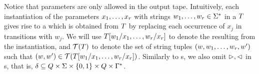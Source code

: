 Notice that parameters are only allowed in the output tape.
Intuitively, each instantiation of the parameters $x_1,\ldots,x_r$ with strings 
$w_1,\ldots, w_r \in \Sigma^*$ in a \PPT{} $T$ gives rise to a \FFT{} which is obtained from $T$ by replacing each occurrence of $x_j$ in transitions with $w_j$.
%
We will use $T[w_1/x_1,\ldots,w_r/x_r]$ to denote the \FFT{} resulting from the instantiation,
%
and $\mathcal{T}(T)$ to denote the set of string tuples 
$(w, w_1, \ldots, w_r, w')$ such that 
$(w,w') \in \mathcal{T}(T[w_1/x_1,\ldots,w_r/x_r])$.
%
Similarly to \FT{}s, we also omit $\vartriangleright, \vartriangleleft$ in \PT{}s, that is, $\delta \subseteq Q \times 
\Sigma \times \{0, 1\} \times Q \times \Gamma^*$.




